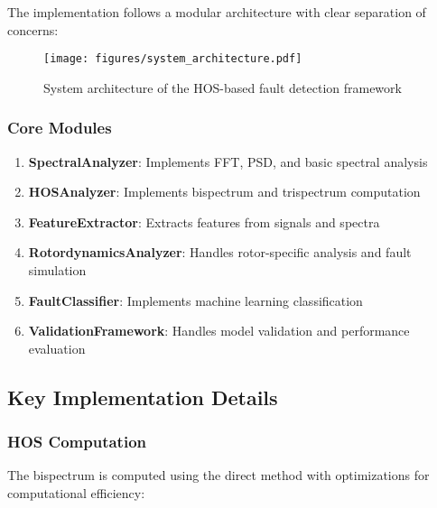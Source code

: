 The implementation follows a modular architecture with clear separation of concerns:

\begin{figure}[H]
\centering
\texttt{[image: figures/system\_architecture.pdf]}
\caption{System architecture of the HOS-based fault detection framework}
\label{fig:system_architecture}
\end{figure}

\subsubsection{Core Modules}

\begin{enumerate}
    \item \textbf{SpectralAnalyzer}: Implements FFT, PSD, and basic spectral analysis
    \item \textbf{HOSAnalyzer}: Implements bispectrum and trispectrum computation
    \item \textbf{FeatureExtractor}: Extracts features from signals and spectra
    \item \textbf{RotordynamicsAnalyzer}: Handles rotor-specific analysis and fault simulation
    \item \textbf{FaultClassifier}: Implements machine learning classification
    \item \textbf{ValidationFramework}: Handles model validation and performance evaluation
\end{enumerate}

\subsection{Key Implementation Details}

\subsubsection{HOS Computation}

The bispectrum is computed using the direct method with optimizations for computational efficiency:

